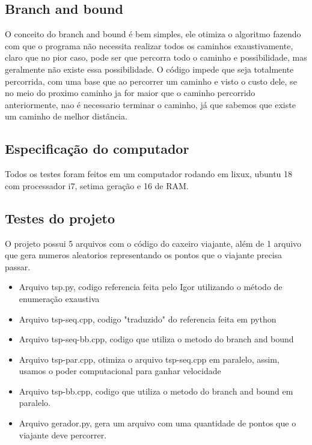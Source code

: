 \documentclass[11pt]{article}
\providecommand{\tightlist}{%
      \setlength{\itemsep}{0pt}\setlength{\parskip}{0pt}}
\begin{document}
\subsection{Branch and bound}\label{branch-and-bound}

O conceito do branch and bound é bem simples, ele otimiza o algoritmo
fazendo com que o programa não necessita realizar todos os caminhos
exaustivamente, claro que no pior caso, pode ser que percorra todo o
caminho e possibilidade, mas geralmente não existe essa possibilidade. O
código impede que seja totalmente percorrida, com uma base que ao
percorrer um caminho e visto o custo dele, se no meio do proximo caminho
ja for maior que o caminho percorrido anteriormente, nao é necessario
terminar o caminho, já que sabemos que existe um caminho de melhor
distância.

    \subsection{Especificação do
computador}\label{especificauxe7uxe3o-do-computador}

Todos os testes foram feitos em um computador rodando em lixux, ubuntu
18 com processador i7, setima geração e 16 de RAM.

    \subsection{Testes do projeto}\label{testes-do-projeto}

O projeto possui 5 arquivos com o código do caxeiro viajante, além de 1
arquivo que gera numeros aleatorios representando os pontos que o
viajante precisa passar.

\begin{itemize}
\tightlist
\item
  Arquivo tsp.py, codigo referencia feita pelo Igor utilizando o método
  de enumeração exaustiva
\item
  Arquivo tsp-seq.cpp, codigo "traduzido" do referencia feita em python
\item
  Arquivo tsp-seq-bb.cpp, codigo que utiliza o metodo do branch and
  bound
\item
  Arquivo tsp-par.cpp, otimiza o arquivo tsp-seq.cpp em paralelo, assim,
  usamos o poder computacional para ganhar velocidade
\item
  Arquivo tsp-bb.cpp, codigo que utiliza o metodo do branch and bound em
  paralelo.
\item
  Arquivo gerador.py, gera um arquivo com uma quantidade de pontos que o
  viajante deve percorrer.
\end{itemize}
\end{document}
